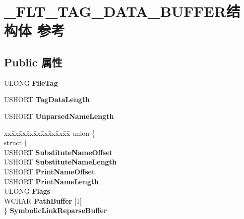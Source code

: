\hypertarget{struct___f_l_t___t_a_g___d_a_t_a___b_u_f_f_e_r}{}\section{\+\_\+\+F\+L\+T\+\_\+\+T\+A\+G\+\_\+\+D\+A\+T\+A\+\_\+\+B\+U\+F\+F\+E\+R结构体 参考}
\label{struct___f_l_t___t_a_g___d_a_t_a___b_u_f_f_e_r}
\subsection*{Public 属性}
\begin{DoxyCompactItemize}
\item 
\mbox{\label{struct___f_l_t___t_a_g___d_a_t_a___b_u_f_f_e_r_aadfa4a5abab930ca5b5c6626908c0cac}} 
U\+L\+O\+NG {\bfseries File\+Tag}
\item 
\mbox{\label{struct___f_l_t___t_a_g___d_a_t_a___b_u_f_f_e_r_a340ee0ed2b2b85013384400804bab192}} 
U\+S\+H\+O\+RT {\bfseries Tag\+Data\+Length}
\item 
\mbox{\label{struct___f_l_t___t_a_g___d_a_t_a___b_u_f_f_e_r_af5811b65cce430efa4dcb44fa5fccbfc}} 
U\+S\+H\+O\+RT {\bfseries Unparsed\+Name\+Length}
\item 
\mbox{\label{struct___f_l_t___t_a_g___d_a_t_a___b_u_f_f_e_r_a45d337d824fc96bebde18df0e41d5571}} 
\begin{tabbing}
xx\=xx\=xx\=xx\=xx\=xx\=xx\=xx\=xx\=\kill
union \{\\
\>struct \{\\
\>\>USHORT {\bfseries SubstituteNameOffset}\\
\>\>USHORT {\bfseries SubstituteNameLength}\\
\>\>USHORT {\bfseries PrintNameOffset}\\
\>\>USHORT {\bfseries PrintNameLength}\\
\>\>ULONG {\bfseries Flags}\\
\>\>WCHAR {\bfseries PathBuffer} \mbox{[}1\mbox{]}\\
\>\} {\bfseries SymbolicLinkReparseBuffer}\\

\end{tabbing}
\end{DoxyCompactItemize}
